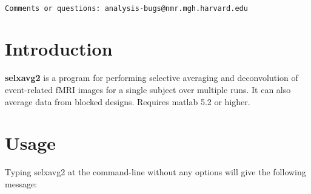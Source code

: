 \documentclass[10pt]{article}
\begin{document}
\begin{Large}
 \\
\end{Large}

\noindent 
\begin{verbatim}
Comments or questions: analysis-bugs@nmr.mgh.harvard.edu
\end{verbatim}

\section{Introduction}
{\bf selxavg2} is a program for performing selective averaging and
deconvolution of event-related fMRI images for a single subject over
multiple runs. It can also average data from blocked designs. Requires
matlab 5.2 or higher.\\

\section{Usage}
Typing selxavg2 at the command-line without any options will give the
following message:\\ 
\end{document}
